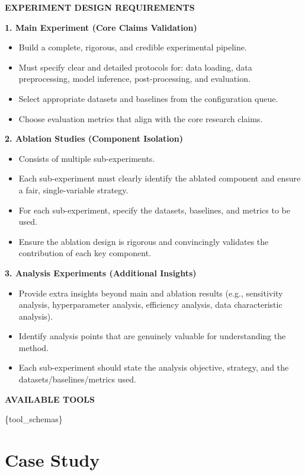 \begin{tcolorbox}
\medskip
\textbf{EXPERIMENT DESIGN REQUIREMENTS}

\textbf{1. Main Experiment (Core Claims Validation)}
\begin{itemize}[nosep,leftmargin=12pt]
	\item Build a complete, rigorous, and credible experimental pipeline.
	\item Must specify clear and detailed protocols for: data loading, data preprocessing, model inference, post-processing, and evaluation.
	\item Select appropriate datasets and baselines from the configuration queue.
	\item Choose evaluation metrics that align with the core research claims.
\end{itemize}

\textbf{2. Ablation Studies (Component Isolation)}
\begin{itemize}[nosep,leftmargin=12pt]
	\item Consists of multiple sub-experiments.
	\item Each sub-experiment must clearly identify the ablated component and ensure a fair, single-variable strategy.
	\item For each sub-experiment, specify the datasets, baselines, and metrics to be used.
	\item Ensure the ablation design is rigorous and convincingly validates the contribution of each key component.
\end{itemize}

\textbf{3. Analysis Experiments (Additional Insights)}
\begin{itemize}[nosep,leftmargin=12pt]
	\item Provide extra insights beyond main and ablation results (e.g., sensitivity analysis, hyperparameter analysis, efficiency analysis, data characteristic analysis).
	\item Identify analysis points that are genuinely valuable for understanding the method.
	\item Each sub-experiment should state the analysis objective, strategy, and the datasets/baselines/metrics used.
\end{itemize}

\medskip
\textbf{AVAILABLE TOOLS}

\{tool\_schemas\}
\end{tcolorbox}

\section{Case Study}

